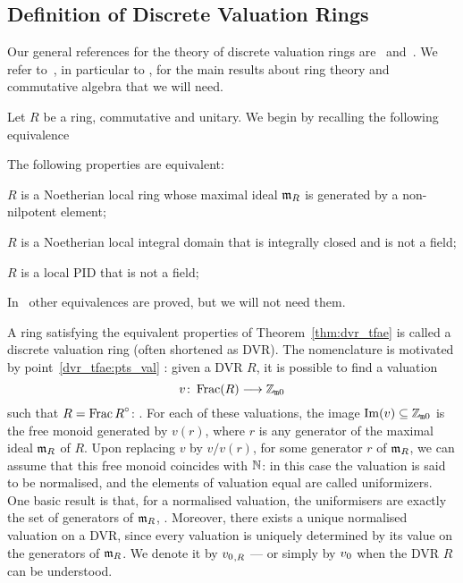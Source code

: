 \documentclass[sigplan,10pt,anonymous,review]{acmart}
\begin{document}
\subsection{Definition of Discrete Valuation Rings}\label{subsection:def_dvr}
Our general references for the theory of discrete valuation rings are~\cite{Ser62} and~\cite[Chapitre~VI]{Bou85}. We refer to~\cite{Bou07}, in particular to \cite[Chapitre~IV]{Bou07}, for the main results about ring theory and commutative algebra that we will need.

Let $R$ be a ring,  commutative and unitary. We begin by recalling the following equivalence
\begin{theorem}\label{thm:dvr_tfae}
The following properties are equivalent:
\begin{listResults}
\item $R$ is a Noetherian local ring whose maximal ideal $\mathfrak{m}_{R}$ is generated by a non-nilpotent element;
\item $R$ is a Noetherian local integral domain that is integrally closed and is not a field;
\item $R$ is a local PID that is not a field;
\item {}\label{dvr_tfae:pts_val}
\end{listResults}
\end{theorem}
\begin{remark}
In~\cite[Chapitre~VI, \S3, n$^\circ$ 6, Proposition~8]{Bou85} other equivalences are proved, but we will not need them.
\end{remark}
A ring satisfying the equivalent properties of Theorem~\ref{thm:dvr_tfae} is called a discrete valuation ring (often shortened as DVR). The nomenclature is motivated by point~\ref{dvr_tfae:pts_val} \ibid: given a DVR $R$, it is possible to find a valuation
\[
v\colon \operatorname{Frac}(R)\longrightarrow \mathbb{Z}_{\mathtt{m}0}
\]
such that $R={\operatorname{Frac} R}^\circ$: . For each of these valuations, the image $\operatorname{Im}(v)\subseteq\mathbb{Z}_{\mathtt{m}0}$ is the free monoid generated by $v(r)$, where $r$ is any generator of the maximal ideal $\mathfrak{m}_{R}$ of $R$. Upon replacing $v$ by $v/v(r)$, for some generator $r$ of $\mathfrak{m}_{R}$, we can assume that this free monoid coincides with $\mathbb{N}$: in this case the valuation is said to be normalised, and the elements of valuation equal are called uniformizers. One basic result is that, for a normalised valuation, the uniformisers are exactly the set of generators of $\mathfrak{m}_{R}$, . Moreover, there exists a unique normalised valuation on a DVR, since every valuation is uniquely determined by its value on the generators of $\mathfrak{m}_{R}$. We denote it by ${{v}_{0}}_{,R}$ --- or simply by ${v}_{0}$ when the DVR $R$ can be understood.
\end{document}
